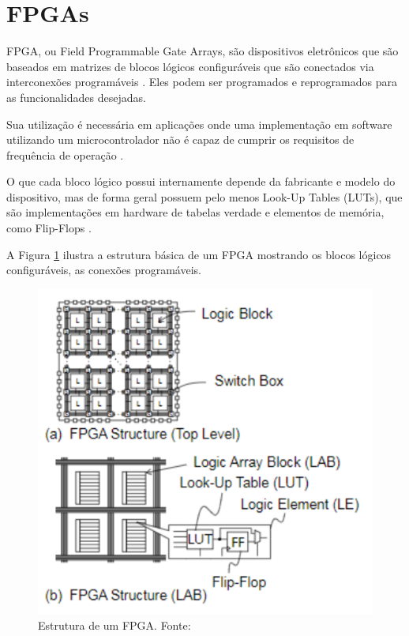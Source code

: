 \section{FPGAs}

FPGA, ou Field Programmable Gate Arrays, são dispositivos eletrônicos que são baseados em matrizes de blocos lógicos configuráveis que são conectados via interconexões programáveis \cite{AmdFpga}. Eles podem ser programados e reprogramados para as funcionalidades desejadas.

Sua utilização é necessária em aplicações onde uma implementação em software utilizando um microcontrolador não é capaz de cumprir os requisitos de frequência de operação \cite{Sulaiman}.

O que cada bloco lógico possui internamente depende da fabricante e modelo do dispositivo, mas de forma geral possuem pelo menos Look-Up Tables (LUTs), que são implementações em hardware de tabelas verdade e elementos de memória, como Flip-Flops \cite{Sato}.

A Figura \ref{fig:FPGAStructure} ilustra a estrutura básica de um FPGA mostrando os blocos lógicos configuráveis, as conexões programáveis.

\begin{figure}[H]
    \centering
    \includegraphics[scale=0.5]{figures/FPGAStructure.png}
    \caption{Estrutura de um FPGA. Fonte: \cite{Sato}}
    \label{fig:FPGAStructure}
\end{figure}

